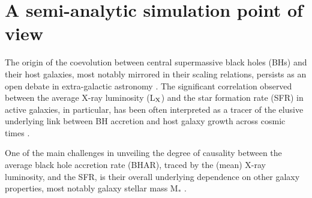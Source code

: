 \chapter{A semi-analytic simulation point of view}



The origin of the coevolution between central supermassive black holes (BHs) and their host galaxies, most notably mirrored in their scaling relations, persists as an open debate in extra-galactic astronomy \citep[e.g.,][]{2013ARA&A..51..511K,2015ApJ...813...82R}. The significant correlation observed between the average X-ray luminosity (L$_{\rm X}$) and the star formation rate (SFR) in active galaxies, in particular, has been often interpreted as a tracer of the elusive underlying link between BH accretion and host galaxy growth across cosmic times \citep{2012ApJ...753L..30M}. 



One of the main challenges in unveiling the degree of causality between the average black hole accretion rate (BHAR), traced by the (mean) X-ray luminosity, and the SFR, is their overall underlying dependence on other galaxy properties, most notably galaxy stellar mass M$_*$ \citep{2015MNRAS.449..373D, 2015ApJ...800L..10R, 2017ApJ...842...72Y, 2017MNRAS.468.3395M}.

